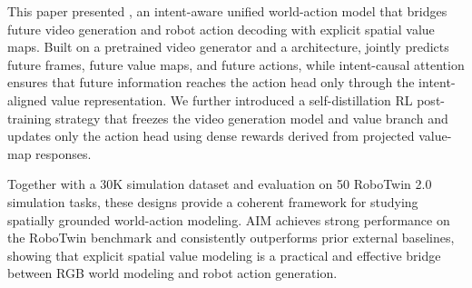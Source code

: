 
This paper presented \method, an intent-aware unified world-action model that bridges future video generation and robot action decoding with explicit spatial value maps. Built on a pretrained video generator and a \mot architecture, \method jointly predicts future frames, future value maps, and future actions, while intent-causal attention ensures that future information reaches the action head only through the intent-aligned value representation. We further introduced a self-distillation RL post-training strategy that freezes the video generation model and value branch and updates only the action head using dense rewards derived from projected value-map responses.

Together with a 30K simulation dataset and evaluation on 50 RoboTwin 2.0~\cite{robotwin2.0} simulation tasks, these designs provide a coherent framework for studying spatially grounded world-action modeling. AIM achieves strong performance on the RoboTwin benchmark and consistently outperforms prior external baselines, showing that explicit spatial value modeling is a practical and effective bridge between RGB world modeling and robot action generation.
\clearpage




